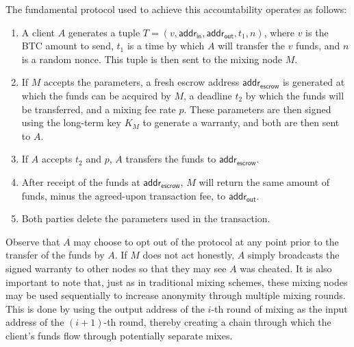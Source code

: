 The fundamental protocol used to achieve this accountability operates as follows:
\begin{enumerate}
	\item A client $A$ generates a tuple $T = (v, \mathsf{addr}_{\mathsf{in}}, \mathsf{addr}_{\mathsf{out}}, t_1, n)$, where $v$ is the BTC amount to send, $t_1$ is a time by which $A$ will transfer the $v$ funds, and $n$ is a random nonce. This tuple is then sent to the mixing node $M$.
	\item If $M$ accepts the parameters, a fresh escrow address $\mathsf{addr}_{\mathsf{escrow}}$ is generated at which the funds can be acquired by $M$, a deadline $t_2$ by which the funds will be transferred, and a mixing fee rate $p$. These parameters are then signed using the long-term key $K_M$ to generate a warranty, and both are then sent to $A$.
	\item If $A$ accepts $t_2$ and $p$, $A$ transfers the funds to $\mathsf{addr}_{\mathsf{escrow}}$.
	\item After receipt of the funds at $\mathsf{addr}_{\mathsf{escrow}}$, $M$ will return the same amount of funds, minus the agreed-upon transaction fee, to $\mathsf{addr}_{\mathsf{out}}$.
	\item Both parties delete the parameters used in the transaction.
\end{enumerate}

Observe that $A$ may choose to opt out of the protocol at any point prior to the transfer of the funds by $A$. If $M$ does not act honestly, $A$ simply broadcasts the signed warranty to other nodes so that they may see $A$ was cheated. It is also important to note that, just as in traditional mixing schemes, these mixing nodes may be used sequentially to increase anonymity through multiple mixing rounds. This is done by using the output address of the $i$-th round of mixing as the input address of the $(i+1)$-th round, thereby creating a chain through which the client's funds flow through potentially separate mixes. 

